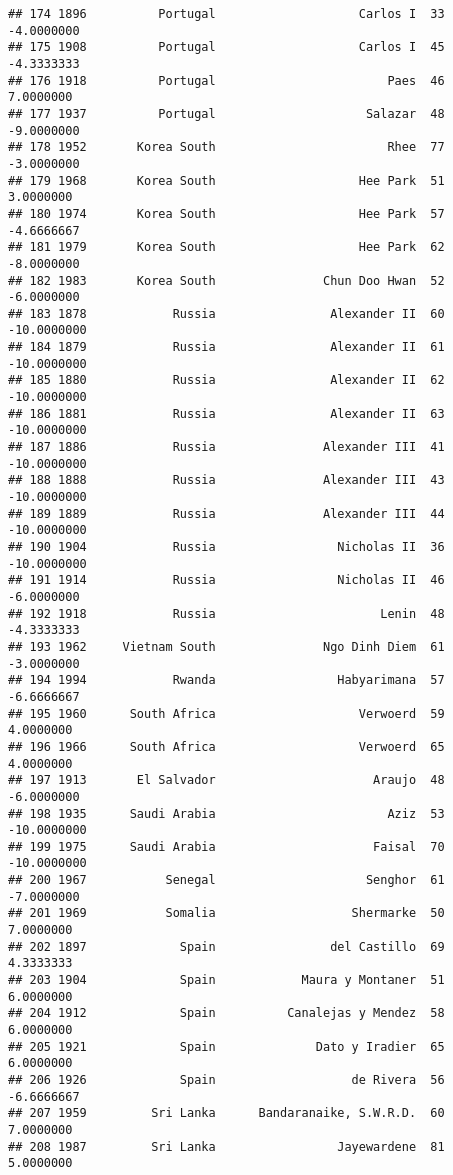 \documentclass[
]{article}
\begin{document}
\begin{verbatim}
## 174 1896          Portugal                    Carlos I  33   -4.0000000
## 175 1908          Portugal                    Carlos I  45   -4.3333333
## 176 1918          Portugal                        Paes  46    7.0000000
## 177 1937          Portugal                     Salazar  48   -9.0000000
## 178 1952       Korea South                        Rhee  77   -3.0000000
## 179 1968       Korea South                    Hee Park  51    3.0000000
## 180 1974       Korea South                    Hee Park  57   -4.6666667
## 181 1979       Korea South                    Hee Park  62   -8.0000000
## 182 1983       Korea South               Chun Doo Hwan  52   -6.0000000
## 183 1878            Russia                Alexander II  60  -10.0000000
## 184 1879            Russia                Alexander II  61  -10.0000000
## 185 1880            Russia                Alexander II  62  -10.0000000
## 186 1881            Russia                Alexander II  63  -10.0000000
## 187 1886            Russia               Alexander III  41  -10.0000000
## 188 1888            Russia               Alexander III  43  -10.0000000
## 189 1889            Russia               Alexander III  44  -10.0000000
## 190 1904            Russia                 Nicholas II  36  -10.0000000
## 191 1914            Russia                 Nicholas II  46   -6.0000000
## 192 1918            Russia                       Lenin  48   -4.3333333
## 193 1962     Vietnam South               Ngo Dinh Diem  61   -3.0000000
## 194 1994            Rwanda                 Habyarimana  57   -6.6666667
## 195 1960      South Africa                    Verwoerd  59    4.0000000
## 196 1966      South Africa                    Verwoerd  65    4.0000000
## 197 1913       El Salvador                      Araujo  48   -6.0000000
## 198 1935      Saudi Arabia                        Aziz  53  -10.0000000
## 199 1975      Saudi Arabia                      Faisal  70  -10.0000000
## 200 1967           Senegal                     Senghor  61   -7.0000000
## 201 1969           Somalia                   Shermarke  50    7.0000000
## 202 1897             Spain                del Castillo  69    4.3333333
## 203 1904             Spain            Maura y Montaner  51    6.0000000
## 204 1912             Spain          Canalejas y Mendez  58    6.0000000
## 205 1921             Spain              Dato y Iradier  65    6.0000000
## 206 1926             Spain                   de Rivera  56   -6.6666667
## 207 1959         Sri Lanka      Bandaranaike, S.W.R.D.  60    7.0000000
## 208 1987         Sri Lanka                 Jayewardene  81    5.0000000

\end{verbatim}
\end{document}

